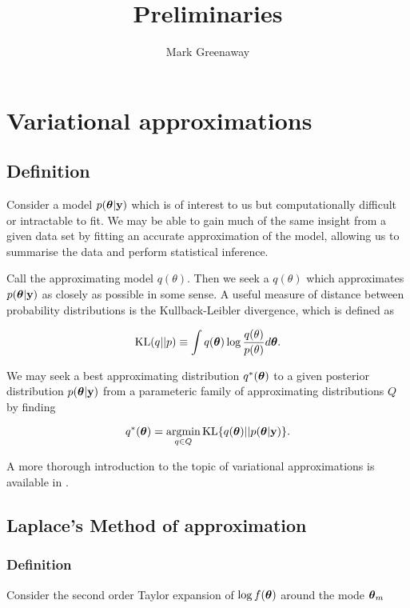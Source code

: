 \documentclass{article}[12pt]
\title{Preliminaries}
\author{Mark Greenaway}
\begin{document}
\setlength{\parindent}{0pt}
\maketitle

\section{Variational approximations}

\subsection{Definition}

Consider a model $p({\boldsymbol \theta}|{\bf y})$ which is of interest to us but computationally difficult or intractable to 
fit. We may be able to gain much of the same insight from a given data set by fitting an accurate approximation 
of the model, allowing us to summarise the data and perform statistical inference.

Call the approximating model $q(\theta)$. Then we seek a $q(\theta)$ which approximates $p({\boldsymbol \theta}|{\bf y})$
as closely as possible in some sense. A useful measure of distance between probability distributions is the
Kullback-Leibler divergence, which is defined as

$$
\text{KL}(q || p) \equiv \int q({\boldsymbol \theta}) \log{\frac{q(\theta)}{p(\theta)}} d {\boldsymbol \theta}.
$$

We may seek a best approximating distribution $q^*({\boldsymbol \theta})$ to a given posterior distribution
$p({\boldsymbol \theta}|{\bf y})$ from a parameteric family of approximating distributions $Q$ by finding

$$
q^*(\vtheta) = \argmin_{q \in Q} \KL \{ {q(\vtheta) || p(\vtheta|\vy)} \}.
$$


A more thorough introduction to the topic of variational approximations is available in \cite{ormerod10}.

\subsection{Laplace's Method of approximation}

\subsubsection{Definition}

Consider the second order Taylor expansion of $\log f({\boldsymbol \theta})$ around the mode ${\boldsymbol \theta}_m$
\end{document}
